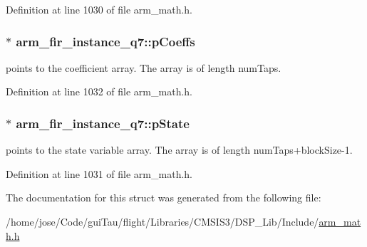 Definition at line 1030 of file arm\-\_\-math.\-h.

\hypertarget{structarm__fir__instance__q7_a0e45aedefc3fffad6cb315c5b6e5bd49}{
\subsubsection[{p\-Coeffs}]{$\ast$ arm\-\_\-fir\-\_\-instance\-\_\-q7\-::p\-Coeffs}}\label{structarm__fir__instance__q7_a0e45aedefc3fffad6cb315c5b6e5bd49}
points to the coefficient array. The array is of length num\-Taps. 

Definition at line 1032 of file arm\-\_\-math.\-h.

\hypertarget{structarm__fir__instance__q7_aaddea3b9c7e16ddfd9428b7bf9f9c200}{
\subsubsection[{p\-State}]{$\ast$ arm\-\_\-fir\-\_\-instance\-\_\-q7\-::p\-State}}\label{structarm__fir__instance__q7_aaddea3b9c7e16ddfd9428b7bf9f9c200}
points to the state variable array. The array is of length num\-Taps+block\-Size-\/1. 

Definition at line 1031 of file arm\-\_\-math.\-h.



The documentation for this struct was generated from the following file\-:\begin{DoxyCompactItemize}
\item 
/home/jose/\-Code/gui\-Tau/flight/\-Libraries/\-C\-M\-S\-I\-S3/\-D\-S\-P\-\_\-\-Lib/\-Include/\hyperlink{arm__math_8h}{arm\-\_\-math.\-h}\end{DoxyCompactItemize}

